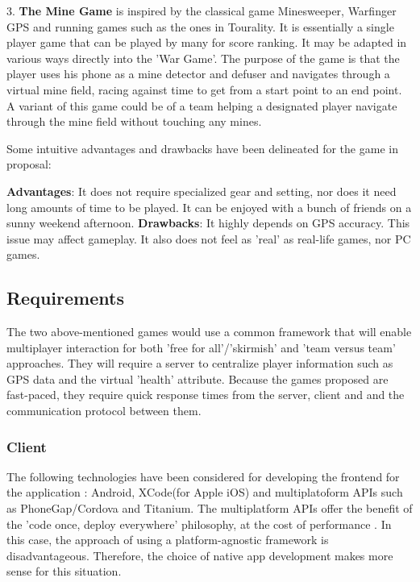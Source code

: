 \documentclass{article}
\begin{document}
3. \textbf{The Mine Game} is inspired by the classical game Minesweeper,
Warfinger GPS and running games such as the ones in Tourality. It is essentially
a single player game that can be played by many for score ranking. It may be
adapted in various ways directly into the 'War Game'. The purpose of the game is
that the player uses his phone as a mine detector and defuser and navigates
through a virtual mine field, racing against time to get from a start point to
an end point. A variant of this game could be of a team helping a
designated player navigate through the mine field without touching any
mines.\newline

Some intuitive advantages and drawbacks have been delineated for the game in
proposal:\newline

\textbf{Advantages}: It does not require specialized gear and setting, nor does
it need long amounts of time to be played. It can be enjoyed with a bunch of
friends on a sunny weekend afternoon.\newline
\textbf{Drawbacks}: It highly depends on GPS accuracy. This issue may affect
gameplay. It also does not feel as 'real' as real-life games, nor PC
games.\newline


\subsection{Requirements}

The two above-mentioned games would use a common framework that will enable
multiplayer interaction for both 'free for all'/'skirmish' and 'team versus team'
approaches. They will require a server to centralize player information such as
GPS data and the virtual 'health' attribute. Because the games proposed are
fast-paced, they require quick response times from the server, client and and
the communication protocol between them.

\subsubsection{Client}
The following technologies have been considered for developing the frontend for
the application : Android, XCode(for Apple iOS) and multiplatoform APIs such as
PhoneGap/Cordova and Titanium. The multiplatform APIs offer the benefit of
the 'code once, deploy everywhere' philosophy, at the cost of performance
\cite{nativevscrossplatform}\cite{nativevscrossplatform2}\cite{nativevscrossplatform3}.
In this case, the approach of using a platform-agnostic framework is
disadvantageous. Therefore, the choice of native app development makes more
sense for this situation.\newline
\end{document}
